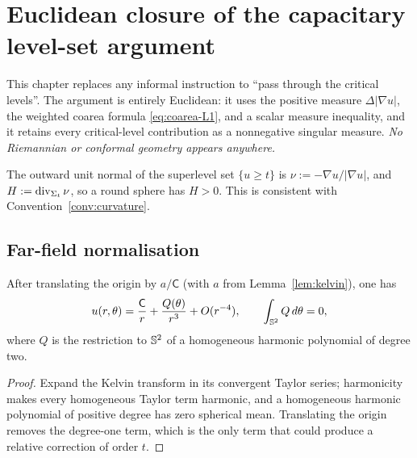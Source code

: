 \chapter{Euclidean closure of the capacitary level-set argument}\label{ch:appK}

This chapter replaces any informal instruction to ``pass through the critical
levels''.  The argument is entirely Euclidean: it uses the positive measure
$\Delta|\nabla u|$, the weighted coarea formula
\eqref{eq:coarea-L1}, and a scalar measure inequality, and it retains every
critical-level contribution as a nonnegative singular measure.  \emph{No
Riemannian or conformal geometry appears anywhere.}

\begin{convention}\label{conv:level-orientation}
The outward unit normal of the superlevel set $\{u\ge t\}$ is
$\nu:=-\nabla u/|\nabla u|$, and $H:=\operatorname{div}_{\Sigma_t}\nu$, so a round sphere has
$H>0$.  This is consistent with Convention~\ref{conv:curvature}.
\end{convention}

\section{Far-field normalisation}

\begin{lemma}\label{lem:K-normalization}
After translating the origin by $a/\mathsf C$ (with $a$ from
Lemma~\ref{lem:kelvin}), one has
\begin{equation}\label{eq:K-expansion}
  u(r,\theta)=\frac{\mathsf C}{r}+\frac{Q(\theta)}{r^3}+O(r^{-4}),
  \qquad
  \int_{\mathbb S^2}Q\,d\theta=0 ,
\end{equation}
where $Q$ is the restriction to $\mathbb S^2$ of a homogeneous harmonic polynomial
of degree two.
\end{lemma}

\begin{proof}
Expand the Kelvin transform in its convergent Taylor series; harmonicity makes
every homogeneous Taylor term harmonic, and a homogeneous harmonic polynomial
of positive degree has zero spherical mean.  Translating the origin removes the
degree-one term, which is the only term that could produce a relative
correction of order $t$.
\end{proof}


